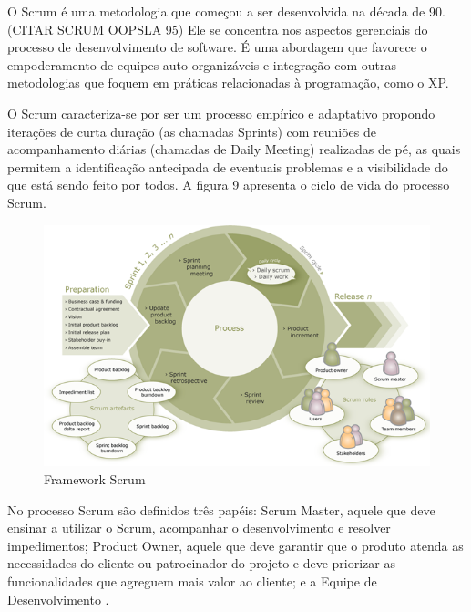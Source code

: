 O Scrum é uma metodologia que começou a ser desenvolvida na década de 90. (CITAR SCRUM OOPSLA 95) Ele se concentra nos aspectos gerenciais do processo de desenvolvimento de software. É uma abordagem que favorece o empoderamento de equipes auto organizáveis e integração com outras metodologias que foquem em práticas relacionadas à programação, como o XP.

O Scrum caracteriza-se por ser um processo empírico e adaptativo propondo iterações de curta duração (as chamadas Sprints) com reuniões de acompanhamento diárias (chamadas de Daily Meeting) realizadas de pé, as quais permitem a identificação antecipada de eventuais problemas e a visibilidade do que está sendo feito por todos. A figura 9 apresenta o ciclo de vida do processo Scrum.

\begin{figure}[h]
		\centering
		\label{fig01}
			\includegraphics[scale=0.9]{figuras/scrum.png}
		\caption{Framework Scrum  \cite{scrumprocess}}
\end{figure}

No processo Scrum são definidos três papéis: Scrum Master, aquele que deve ensinar a utilizar o Scrum, acompanhar o desenvolvimento e resolver impedimentos; Product Owner, aquele que deve garantir que o produto atenda as necessidades do cliente ou patrocinador do projeto e deve priorizar as funcionalidades que agreguem mais valor ao cliente; e a Equipe de Desenvolvimento   \cite{jeff}.

